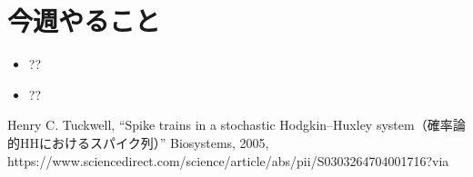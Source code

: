 \documentclass[dvipdfmx, A4j, twocolumn, 10.5pt]{jsarticle}
\begin{document}
\section{今週やること}
\begin{itemize}
 \item ??
 \item ??
\end{itemize}




\begin{thebibliography}{99}
 Henry C. Tuckwell, ``Spike trains in a stochastic Hodgkin–Huxley system（確率論的HHにおけるスパイク列）'' Biosystems, 2005, https://www.sciencedirect.com/science/article/abs/pii/S0303264704001716?via%
\end{thebibliography}
\end{document}
